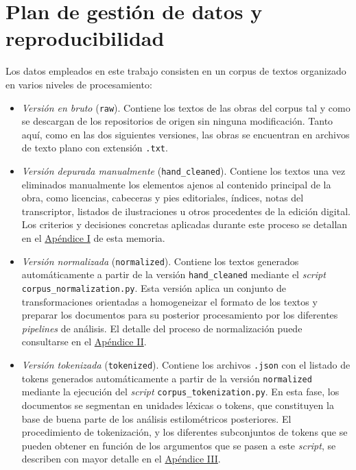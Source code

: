 \documentclass[IB]{TFUOC}%
\begin{document}
\section{Plan de gestión de datos y reproducibilidad}

Los datos empleados en este trabajo consisten en un corpus de textos organizado en varios niveles de procesamiento:

\begin{itemize}
	\item \textit{Versión en bruto} (\texttt{raw}). Contiene los textos de las obras del corpus tal y como se descargan de los repositorios de origen sin ninguna modificación. Tanto aquí, como en las dos siguientes versiones, las obras se encuentran en archivos de texto plano con extensión \texttt{.txt}.
	\item \textit{Versión depurada manualmente} (\texttt{hand\_cleaned}). Contiene los textos una vez eliminados manualmente los elementos ajenos al contenido principal de la obra, como licencias, cabeceras y pies editoriales, índices, notas del transcriptor, listados de ilustraciones u otros procedentes de la edición digital. Los criterios y decisiones concretas aplicadas durante este proceso se detallan en el \hyperref[apx:limpieza-manual]{Apéndice I} de esta memoria.
	\item \textit{Versión normalizada} (\texttt{normalized}). Contiene los textos generados automáticamente a partir de la versión \texttt{hand\_cleaned} mediante el \textit{script} \texttt{corpus\_normalization.py}. Esta versión aplica un conjunto de transformaciones orientadas a homogeneizar el formato de los textos y preparar los documentos para su posterior procesamiento por los diferentes \textit{pipelines} de análisis. El detalle del proceso de normalización puede consultarse en el \hyperref[apx:normalizacion]{Apéndice II}.
	\item \textit{Versión tokenizada} (\texttt{tokenized}). Contiene los archivos \texttt{.json} con el listado de tokens generados automáticamente a partir de la versión \texttt{normalized} mediante la ejecución del \textit{script} \texttt{corpus\_tokenization.py}. En esta fase, los documentos se segmentan en unidades léxicas o tokens, que constituyen la base de buena parte de los análisis estilométricos posteriores. El procedimiento de tokenización, y los diferentes subconjuntos de tokens que se pueden obtener en función de los argumentos que se pasen a este \textit{script}, se describen con mayor detalle en el \hyperref[apx:tokenizacion]{Apéndice III}.
\end{itemize}
\end{document}
